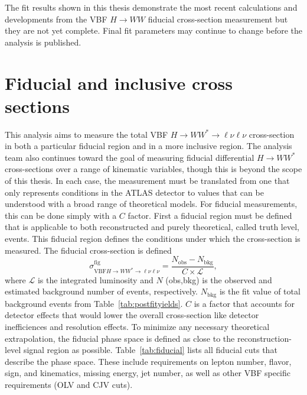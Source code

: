 The fit results shown in this thesis demonstrate the most recent calculations and developments from the VBF $H\rightarrow WW$ fiducial cross-section measurement but they are not yet complete. Final fit parameters may continue to change before the analysis is published. 

\section{Fiducial and inclusive cross sections}
This analysis aims to measure the total VBF $H\rightarrow WW^*\rightarrow\ell\nu\ell\nu$ cross-section in both a particular fiducial region and in a more inclusive region. The analysis team also continues toward the goal of measuring fiducial differential $H\rightarrow WW^*$ cross-sections over a range of kinematic variables, though this is beyond the scope of this thesis. In each case, the measurement must be translated from one that only represents conditions in the ATLAS detector to values that can be understood with a broad range of theoretical models. For fiducial measurements, this can be done simply with a $C$ factor. First a fiducial region must be defined that is applicable to both reconstructed and purely theoretical, called truth level, events. This fiducial region defines the conditions under which the cross-section is measured. The fiducial cross-section is defined
\begin{equation}
\sigma_{\text{VBF}H\rightarrow WW^*\rightarrow\ell\nu\ell\nu}^{\text{fig}} = \frac{N_{\text{obs}}-N_{\text{bkg}}}{C\times\mathcal{L}},
\end{equation} 
where $\mathcal{L}$ is the integrated luminosity and $N$ (obs,bkg) is the observed and estimated background number of events, respectively. $N_{\text{bkg}}$ is the fit value of total background events from Table~\ref{tab:postfityields}. $C$ is a factor that accounts for detector effects that would lower the overall cross-section like detector inefficiences and resolution effects. To minimize any necessary theoretical extrapolation, the fiducial phase space is defined as close to the reconstruction-level signal region as possible. Table~\ref{tab:fiducial} lists all fiducial cuts that describe the phase space. These include requirements on lepton number, flavor, sign, and kinematics, missing energy, jet number, as well as other VBF specific requirements (OLV and CJV cuts). 
